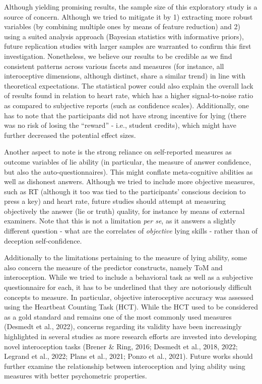 \documentclass[
  man,mask,floatsintext]{apa6}
\begin{document}
Although yielding promising results, the sample size of this exploratory study is a source of concern. Although we tried to mitigate it by 1) extracting more robust variables (by combining multiple ones by means of feature reduction) and 2) using a suited analysis approach (Bayesian statistics with informative priors), future replication studies with larger samples are warranted to confirm this first investigation. Nonetheless, we believe our results to be credible as we find consistent patterns across various facets and measures (for instance, all interoceptive dimensions, although distinct, share a similar trend) in line with theoretical expectations. The statistical power could also explain the overall lack of results found in relation to heart rate, which has a higher signal-to-noise ratio as compared to subjective reports (such as confidence scales). Additionally, one has to note that the participants did not have strong incentive for lying (there was no risk of losing the ``reward'' - i.e., student credits), which might have further decreased the potential effect sizes.

Another aspect to note is the strong reliance on self-reported measures as outcome variables of lie ability (in particular, the measure of answer confidence, but also the auto-questionnaires). This might conflate meta-cognitive abilities as well as dishonest answers. Although we tried to include more objective measures, such as RT (although it too was tied to the participants' conscious decision to press a key) and heart rate, future studies should attempt at measuring objectively the answer (lie or truth) quality, for instance by means of external examiners. Note that this is not a limitation \emph{per se}, as it answers a slightly different question - what are the correlates of \emph{objective} lying skills - rather than of deception self-confidence.

Additionally to the limitations pertaining to the measure of lying ability, some also concern the measure of the predictor constructs, namely ToM and interoception. While we tried to include a behavioral task as well as a subjective questionnaire for each, it has to be underlined that they are notoriously difficult concepts to measure. In particular, objective interoceptive accuracy was assessed using the Heartbeat Counting Task (HCT). While the HCT used to be considered as a gold standard and remains one of the most commonly used measures (Desmedt et al., 2022), concerns regarding its validity have been increasingly highlighted in several studies as more research efforts are invested into developing novel interoception tasks (Brener \& Ring, 2016; Desmedt et al., 2018, 2022; Legrand et al., 2022; Plans et al., 2021; Ponzo et al., 2021). Future works should further examine the relationship between interoception and lying ability using measures with better psychometric properties.
\end{document}
